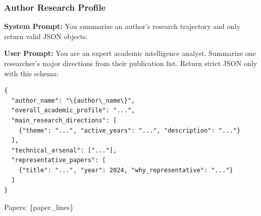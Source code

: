 \subsubsection{Author Research Profile}
\label{prompt:task5-author-profile}

\begin{tcolorbox}[breakable, colback=purple!5!white, colframe=purple!60!black,
  left=1ex, right=1ex, top=0.5ex, bottom=0.5ex,
  fontupper=\small\ttfamily, fontlower=\small\ttfamily,
  title=\textbf{Author Research Profile:} Summarize a researcher's major directions from their publication list.]
\textbf{System Prompt:}
You summarize an author's research trajectory and only return valid JSON objects.

\medskip\textbf{User Prompt:}
You are an expert academic intelligence analyst.
Summarize one researcher's major directions from their publication list.
Return strict JSON only with this schema:
\begin{verbatim}
{
  "author_name": "\{author\_name\}",
  "overall_academic_profile": "...",
  "main_research_directions": [
    {"theme": "...", "active_years": "...", "description": "..."}
  ],
  "technical_arsenal": ["..."],
  "representative_papers": [
    {"title": "...", "year": 2024, "why_representative": "..."}
  ]
}
\end{verbatim}

Papers:
\{paper\_lines\}
\end{tcolorbox}


